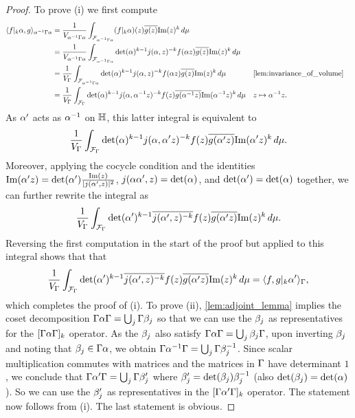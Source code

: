     \begin{proof}
      To prove (i) we first compute
      \begin{align*}
        \<f|_{k}\a,g\>_{\a^{-1}\G\a} &= \frac{1}{V_{\a^{-1}\G\a}}\int_{\mc{F}_{\a^{-1}\G\a}}(f|_{k}\a)(z)\conj{g(z)}\Im(z)^{k}\,d\mu \\
        &= \frac{1}{V_{\a^{-1}\G\a}}\int_{\mc{F}_{\a^{-1}\G\a}}\det(\a)^{k-1}j(\a,z)^{-k}f(\a z)\conj{g(z)}\Im(z)^{k}\,d\mu \\
        &= \frac{1}{V_{\G}}\int_{\mc{F}_{\a^{-1}\G\a}}\det(\a)^{k-1}j(\a,z)^{-k}f(\a z)\conj{g(z)}\Im(z)^{k}\,d\mu && \text{\cref{lem:invariance_of_volume}} \\
        &= \frac{1}{V_{\G}}\int_{\mc{F}_{\G}}\det(\a)^{k-1}j(\a,\a^{-1}z)^{-k}f(z)\conj{g(\a^{-1}z)}\Im(\a^{-1}z)^{k}\,d\mu && \text{$z \mapsto \a^{-1}z$.}
      \end{align*}
      As $\alpha'$ acts as $\alpha^{-1}$ on $\mathbb{H}$, this latter integral is equivalent to
      \[
        \frac{1}{V_{\Gamma}}\int_{\mathcal{F}_{\Gamma}}\det(\alpha)^{k-1}j(\alpha,\alpha'z)^{-k}f(z)\overline{g(\alpha'z)}\mathrm{Im}(\alpha'z)^{k}\,d\mu.
      \]
      Moreover, applying the cocycle condition and the identities $\mathrm{Im}(\alpha'z) = \det(\alpha')\frac{\mathrm{Im}(z)}{|j(\alpha',z)|^{2}}$, $j(\alpha\alpha',z) = \det(\alpha)$, and $\det(\alpha') = \det(\alpha)$ together, we can further rewrite the integral as
      \[
        \frac{1}{V_{\Gamma}}\int_{\mathcal{F}_{\Gamma}}\det(\alpha')^{k-1}\overline{j(\alpha',z)^{-k}}f(z)\overline{g(\alpha'z)}\mathrm{Im}(z)^{k}\,d\mu.
      \]
      Reversing the first computation in the start of the proof but applied to this integral shows that that
      \[
        \frac{1}{V_{\Gamma}}\int_{\mathcal{F}_{\Gamma}}\det(\alpha')^{k-1}\overline{j(\alpha',z)^{-k}}f(z)\overline{g(\alpha'z)}\mathrm{Im}(z)^{k}\,d\mu = \langle f,g|_{k}\alpha'\rangle_{\Gamma},
      \]
      which completes the proof of (i). To prove (ii), \cref{lem:adjoint_lemma} implies the coset decomposition $\Gamma\alpha\Gamma = \bigcup_{j}\Gamma\beta_{j}$ so that we can use the $\beta_{j}$ as representatives for the $[\Gamma\alpha\Gamma]_{k}$ operator. As the $\beta_{j}$ also satisfy $\Gamma\alpha\Gamma = \bigcup_{j}\beta_{j}\Gamma$, upon inverting $\beta_{j}$ and noting that $\beta_{j} \in \Gamma\alpha$, we obtain $\Gamma\alpha^{-1}\Gamma = \bigcup_{j}\Gamma\beta_{j}^{-1}$. Since scalar multiplication commutes with matrices and the matrices in $\Gamma$ have determinant $1$, we conclude that $\Gamma\alpha'\Gamma = \bigcup_{j}\Gamma\beta_{j}'$ where $\beta_{j}' = \det(\beta_{j})\beta_{j}^{-1}$ (also $\det(\beta_{j}) = \det(\alpha)$). So we can use the $\beta_{j}'$ as representatives in the $[\Gamma\alpha'\Gamma]_{k}$ operator. The statement now follows from (i). The last statement is obvious.
    \end{proof}

